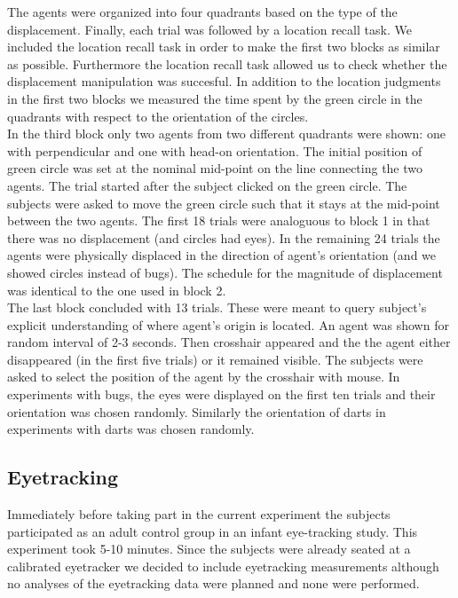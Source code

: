 \documentclass[10pt]{article}
\begin{document}
The agents were organized into four quadrants based on the type of the displacement. 
Finally, each trial was followed by a location recall task. 
We included the location recall task in order to make the first two blocks as similar as possible. 
Furthermore the location recall task allowed us to check whether the displacement manipulation was succesful.
In addition to the location judgments in the first two blocks we measured the time spent by the green circle in the quadrants with respect to the orientation of the circles.\\
In the third block only two agents from two different quadrants were shown: one with perpendicular and one with head-on orientation. 
The initial position of green circle was set at the nominal mid-point on the line connecting the two agents. 
The trial started after the subject clicked on the green circle. 
The subjects were asked to move the green circle such that it stays at the mid-point between the two agents. 
The first 18 trials were analoguous to block 1 in that there was no displacement (and circles had eyes). 
In the remaining 24 trials the agents were physically displaced in the direction of agent's orientation (and we showed circles instead of bugs). 
The schedule for the magnitude of displacement was identical to the one used in block 2.\\
The last block concluded with 13 trials. 
These were meant to query subject's explicit understanding of where agent's origin is located. 
An agent was shown for random interval of 2-3 seconds. 
Then crosshair appeared and the the agent either disappeared (in the first five trials) or it remained visible. 
The subjects were asked to select the position of the agent by the crosshair with mouse. 
In experiments with bugs, the eyes were displayed on the first ten trials and their orientation was chosen randomly. 
Similarly the orientation of darts in experiments with darts was chosen randomly.\\
 
\subsection*{Eyetracking}
Immediately before taking part in the current experiment the subjects participated as an adult control group in an infant eye-tracking study. 
This experiment took 5-10 minutes. 
Since the subjects were already seated at a calibrated eyetracker we decided to include eyetracking measurements although no analyses of the eyetracking data were planned and none were performed.
\end{document}
